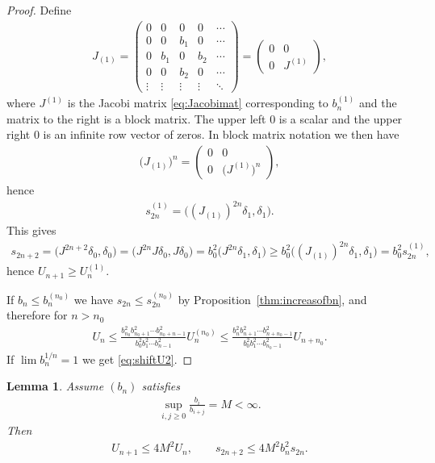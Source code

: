 \documentclass[pdftex]{sigma}
\numberwithin{equation}{section}
\newtheorem{lem}[thm]{Lemma}
\begin{document}
\begin{proof} Define
\begin{gather*}
J_{(1)}=\begin{pmatrix} 0 & 0 & 0 & 0 & \cdots\\
 0 & 0 & b_1 & 0 & \cdots\\
 0 & b_1 & 0 & b_2 & \cdots\\
 0 & 0 & b_2 & 0 & \cdots\\
 \vdots & \vdots & \vdots & \vdots & \ddots
\end{pmatrix}=
\begin{pmatrix} 0 & 0\\
0 & J^{(1)}
\end{pmatrix},
\end{gather*}
where $J^{(1)}$ is the Jacobi matrix \eqref{eq:Jacobimat} corresponding to $b_n^{(1)}$ and the matrix to the right is a block matrix. The upper left $0$ is a scalar and the upper right $0$ is an infinite row vector of zeros. In block matrix notation we then have
\begin{gather*}
\big(J_{(1)}\big)^n=\begin{pmatrix} 0 & 0\\
0 & \big(J^{(1)}\big)^n
\end{pmatrix},
\end{gather*}
hence
\begin{gather*}
s_{2n}^{(1)}=\big((J_{(1)})^{2n} \delta_1,\delta_1\big).
\end{gather*}
This gives
\begin{gather*}
s_{2n+2} = \big(J^{2n+2}\delta_0,\delta_0\big)=\big(J^{2n}J\delta_0,J\delta_0\big)=b_0^2\big(J^{2n}\delta_1,\delta_1\big)
\ge b_0^2 \big((J_{(1)})^{2n} \delta_1,\delta_1\big)=b_0^2s_{2n}^{(1)},
\end{gather*}
hence $U_{n+1}\ge U_n^{(1)}$.

If $b_n\le b_n^{(n_0)}$ we have $s_{2n}\le s_{2n}^{(n_0)}$ by Proposition~\ref{thm:increasofbn}, and therefore for $n>n_0$
\begin{gather*}
U_n\le \frac{b_{n_0}^2b_{n_0+1}^2\cdots b_{n_0+n-1}^2}{b_0^2 b_1^2\cdots b_{n-1}^2}U_n^{(n_0)}\le \frac{b_n^2b_{n+1}^2\cdots b_{n+n_0-1}^2}{b_0^2 b_1^2\cdots b_{n_0-1}^2}U_{n+n_0}.
\end{gather*}
If $\lim b_n^{1/n}=1$ we get \eqref{eq:shiftU2}.
\end{proof}

\begin{lem}\label{thm:b_i/b_{i+1}} Assume $(b_n)$ satisfies
\begin{gather*}
\sup_{i,j\ge 0}\frac{b_i}{b_{i+j}}=M<\infty.
\end{gather*}
Then
\begin{gather}\label{eq:Un+1}
U_{n+1}\le 4M^2U_n,\qquad s_{2n+2}\le 4M^2b_n^2s_{2n}.
\end{gather}
\end{lem}
\end{document}
